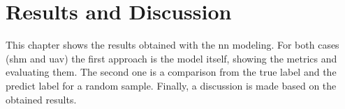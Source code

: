 \chapter{Results and Discussion}\label{sec:results}

This chapter shows the results obtained with the \gls*{nn} modeling.
For both cases (\gls*{shm} and \gls*{uav}) the first approach is the model itself, showing the metrics and evaluating them.
The second one is a comparison from the true label and the predict label for a random sample.
Finally, a discussion is made based on the obtained results.

